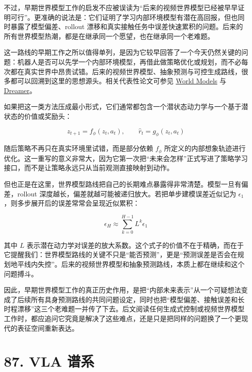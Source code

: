 不过，早期世界模型工作的启发不应被误读为“后来的视频世界模型已经被早早证明可行”。更准确的说法是：它们证明了学习内部环境模型有潜在高回报，但也同时暴露了模型偏差、rollout 漂移和真实接触任务中误差快速累积的问题。后来的所有世界模型热潮，都是在继承同一个愿望，也在继承同一个老难题。

这一路线的早期工作之所以值得单列，是因为它较早回答了一个今天仍然关键的问题：机器人是否可以先学一个内部环境模型，再借此做策略优化或规划，而不必每次都在真实世界中昂贵试错。后来的视频世界模型、抽象预测与可控生成路线，很多都可以回溯到这里的思想源头。相关代表性论文可参见 \href{https://arxiv.org/abs/1803.10122}{World Models} 与 \href{https://arxiv.org/abs/1912.01603}{Dreamer}。

如果把这一类方法压成最小形式，它们通常都包含一个潜状态动力学与一个基于潜状态的价值或奖励头：

\begingroup
\footnotesize
\begin{equation*}
z_{t+1}=f_{\phi}(z_t,a_t),\qquad
\hat r_t=g_{\phi}(z_t,a_t)
\end{equation*}
\endgroup

随后策略不再只在真实环境里试错，而是部分依赖 \(f_{\phi}\) 所定义的内部想象轨迹进行优化。这一重写的意义非常大，因为它第一次把“未来会怎样”正式写进了策略学习接口，而不是让策略永远只从当前观测直接映射到动作。

但也正是在这里，世界模型路线把自己的长期难点暴露得非常清楚。模型一旦有偏差，rollout 深度越长，偏差就越可能被递归放大。若把单步建模误差近似记为 \(\epsilon_1\)，则多步展开后的误差常常会呈现近似累积：

\begin{equation*}
\epsilon_H \approx \sum_{k=0}^{H-1} L^{k}\epsilon_1
\end{equation*}

其中 \(L\) 表示潜在动力学对误差的放大系数。这个式子的价值不在于精确，而在于它提醒我们：世界模型路线的关键不只是“能否预测”，更是“预测误差是否会在规划地平线内失控”。后来的视频世界模型和抽象预测路线，本质上都在继续和这个问题搏斗。

因此，早期世界模型工作的真正历史作用，是把“内部未来表示”从一个可疑想法变成了后续所有具身预测路线的共同问题设定，同时也把“模型偏差、接触误差和长时程漂移”这三个老难题一并传了下去。后文阅读任何生成式控制或视频世界模型工作时，都应追问它究竟是解决了这些难点，还是只是把同样的问题换了一个更现代的表征空间重新表达。

\section*{87. VLA 谱系}

